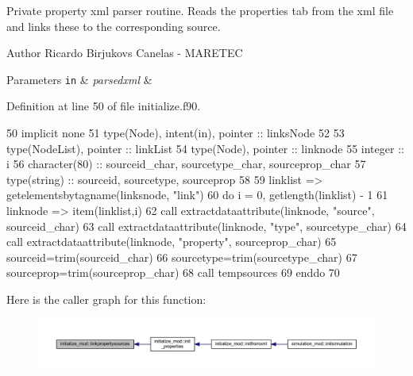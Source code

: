 Private property xml parser routine. Reads the properties tab from the xml file and links these to the corresponding source. 

\begin{DoxyAuthor}{Author}
Ricardo Birjukovs Canelas -\/ M\+A\+R\+E\+T\+EC
\end{DoxyAuthor}

\begin{DoxyParams}[1]{Parameters}
\mbox{\tt in}  & {\em parsedxml} & \\
\hline
\end{DoxyParams}


Definition at line 50 of file initialize.\+f90.


\begin{DoxyCode}
50     \textcolor{keywordtype}{implicit none}
51     \textcolor{keywordtype}{type}(Node), \textcolor{keywordtype}{intent(in)}, \textcolor{keywordtype}{pointer} :: linksNode
52 
53     \textcolor{keywordtype}{type}(NodeList), \textcolor{keywordtype}{pointer} :: linkList
54     \textcolor{keywordtype}{type}(Node), \textcolor{keywordtype}{pointer} :: linknode
55     \textcolor{keywordtype}{integer} :: i
56     \textcolor{keywordtype}{character(80)} :: sourceid\_char, sourcetype\_char, sourceprop\_char
57     \textcolor{keywordtype}{type}(string) :: sourceid, sourcetype, sourceprop
58 
59     linklist => getelementsbytagname(linksnode, \textcolor{stringliteral}{"link"})
60     \textcolor{keywordflow}{do} i = 0, getlength(linklist) - 1
61         linknode => item(linklist,i)
62         \textcolor{keyword}{call }extractdataattribute(linknode, \textcolor{stringliteral}{"source"}, sourceid\_char)
63         \textcolor{keyword}{call }extractdataattribute(linknode, \textcolor{stringliteral}{"type"}, sourcetype\_char)
64         \textcolor{keyword}{call }extractdataattribute(linknode, \textcolor{stringliteral}{"property"}, sourceprop\_char)
65         sourceid=trim(sourceid\_char)
66         sourcetype=trim(sourcetype\_char)
67         sourceprop=trim(sourceprop\_char)
68         \textcolor{keyword}{call }tempsources%
69 \textcolor{keywordflow}{    enddo}
70 
\end{DoxyCode}
Here is the caller graph for this function\+:\nopagebreak
\begin{figure}[H]
\begin{center}
\leavevmode
\includegraphics[width=350pt]{namespaceinitialize__mod_af38ade977df8d56db1d125bc4cc03a4a_icgraph}
\end{center}
\end{figure}
\mbox{\label{namespaceinitialize__mod_aebe8236f74bc6665b16463683c478602}} 

